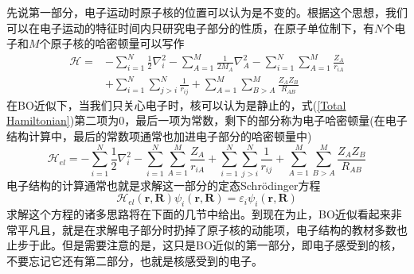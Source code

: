 \documentclass[12pt,a4paper,openany,twoside]{book}
\numberwithin{equation}{section}
\begin{document}
    先说第一部分，电子运动时原子核的位置可以认为是不变的。根据这个思想，我们可以在电子运动的特征时间内只研究电子部分的性质，在原子单位制下，有$N$个电子和$M$个原子核的哈密顿量可以写作      
    \begin{equation}
      \begin{aligned} \mathscr { H } = & - \sum _ { i = 1 } ^ { N } \frac { 1 } { 2 } \nabla _ { i } ^ { 2 } - \sum _ { A = 1 } ^ { M } \frac { 1 } { 2 M _ { A } } \nabla _ { A } ^ { 2 } - \sum _ { i = 1 } ^ { N } \sum _ { A = 1 } ^ { M } \frac { Z _ { A } } { r _ { i A } } \\ & + \sum _ { i = 1 } ^ { N } \sum _ { j > i } ^ { N } \frac { 1 } { r _ { i j } } + \sum _ { A = 1 } ^ { M } \sum _ { B > A } ^ { M } \frac { Z _ { A } Z _ { B } } { R _ { A B } } \end{aligned}
      \label{Total Hamiltonian}
    \end{equation}
    在BO近似下，当我们只关心电子时，核可以认为是静止的，式(\ref{Total Hamiltonian})第二项为0，最后一项为常数，剩下的部分称为电子哈密顿量(在电子结构计算中，最后的常数项通常也加进电子部分的哈密顿量中)
    \begin{equation}
      \mathscr { H } _{el} = - \sum _ { i = 1 } ^ { N } \frac { 1 } { 2 } \nabla _ { i } ^ { 2 } - \sum _ { i = 1 } ^ { N } \sum _ { A = 1 } ^ { M } \frac { Z _ { A } } { r _ { i A } } + \sum _ { i = 1 } ^ { N } \sum _ { j > i } ^ { N } \frac { 1 } { r _ { i j } } + \sum _ { A = 1 } ^ { M } \sum _ { B > A } ^ { M } \frac { Z _ { A } Z _ { B } } { R _ { A B } }
      \label{electronic Hamiltonian}
    \end{equation}
    电子结构的计算通常也就是求解这一部分的定态Schr\"odinger方程
    \begin{equation}
      \mathscr { H } _{el}(\mathbf{r,R})\psi_i(\mathbf{r,R}) = \varepsilon_i\psi_i(\mathbf{r,R})
      \label{electronic static SE}
    \end{equation}
    求解这个方程的诸多思路将在下面的几节中给出。到现在为止，BO近似看起来非常平凡且，就是在求解电子部分时扔掉了原子核的动能项，电子结构的教材多数也止步于此。但是需要注意的是，这只是BO近似的第一部分，即电子感受到的核，不要忘记它还有第二部分，也就是核感受到的电子。
\end{document}
